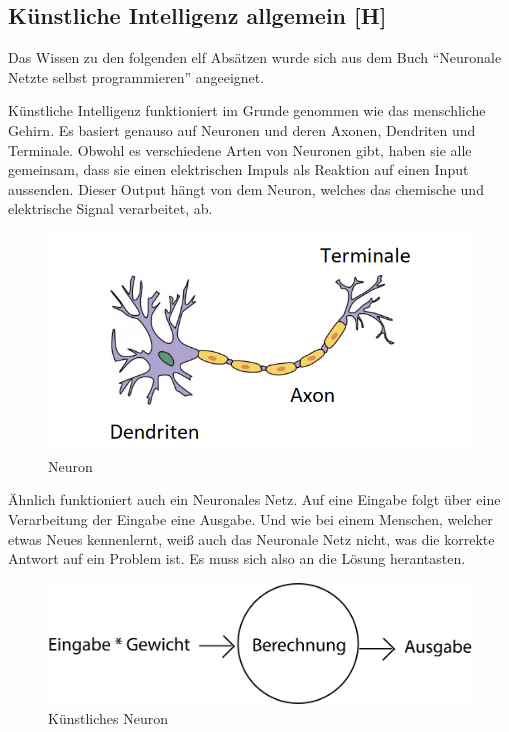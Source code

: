 \subsection{Künstliche Intelligenz allgemein [H]}\label{tech:ki:head}
Das Wissen zu den folgenden elf Absätzen wurde sich aus dem Buch ``Neuronale Netzte selbst programmieren'' angeeignet. \cite{nnselbst}

Künstliche Intelligenz funktioniert im Grunde genommen wie das menschliche Gehirn. Es basiert genauso auf Neuronen und deren Axonen, Dendriten und Terminale. Obwohl es verschiedene Arten von Neuronen gibt, haben sie alle gemeinsam, dass sie einen elektrischen Impuls als Reaktion auf einen Input aussenden. Dieser Output hängt von dem Neuron, welches das chemische und elektrische Signal verarbeitet, ab.

\begin{figure}[H]
    \centering
    \includegraphics[scale=1]{pics/Neuron.png}
    \caption{Neuron \cite{tech:neuron:cite}}
    \label{fig:tech:Neuron}
\end{figure}

Ähnlich funktioniert auch ein Neuronales Netz. Auf eine Eingabe folgt über eine Verarbeitung der Eingabe eine Ausgabe. Und wie bei einem Menschen, welcher etwas Neues kennenlernt, weiß auch das Neuronale Netz nicht, was die korrekte Antwort auf ein Problem ist. Es muss sich also an die Lösung herantasten.

\begin{figure}[H]
    \centering
    \includegraphics[scale=0.3]{pics/eba.png}
    \caption{Künstliches Neuron}
    \label{fig:tech:eba}
\end{figure}

